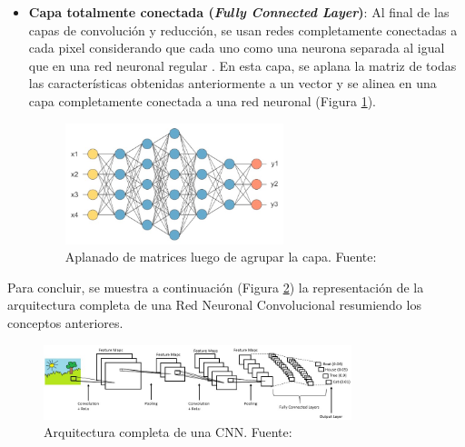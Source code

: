 \begin{itemize}
\begin{itemize}
\begin{itemize}
			\item \textbf{Capa totalmente conectada (\textit{Fully Connected Layer})}: Al final de las capas de convolución y reducción, se usan redes completamente conectadas a cada pixel considerando que cada uno como una neurona separada al igual que en una red neuronal regular \parencite{tec_lopez2016cnnTF}. En esta capa, se aplana la matriz de todas las características obtenidas anteriormente a un vector y se alinea en una capa completamente conectada a una red neuronal (Figura \ref{2:fig32}).
			\begin{figure}[h]
				\begin{center}
					\includegraphics[width=0.60\textwidth]{2/figures/fully_conected_cnn.jpg}
					\caption{Aplanado de matrices luego de agrupar la capa. Fuente: \cite{tec_prabhu2018cnn}}
					\label{2:fig32}
				\end{center}
			\end{figure}
		\end{itemize}
		Para concluir, se muestra a continuación (Figura \ref{2:fig33}) la representación de la arquitectura completa de una Red Neuronal Convolucional resumiendo los conceptos anteriores.
		\begin{figure}[h]
			\begin{center}
				\includegraphics[width=0.8\textwidth]{2/figures/arquitectura_cnn.jpg}
				\caption{Arquitectura completa de una CNN. Fuente: \cite{tec_prabhu2018cnn}}
				\label{2:fig33}
			\end{center}
		\end{figure}
		

\end{itemize}
\end{itemize}
